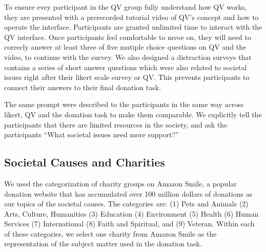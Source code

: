 
To ensure evey participant
in the QV group
fully understand how QV works,
they are presented 
with a prerecorded tutorial video
of QV's concept and how to operate the interface.
Participants are granted unlimited time
to interact with the QV interface.
Once participants feel comfortable to mvoe on, 
they will need to correcly answer at least three
of five mutiple choice questions 
on QV and the video,
to continue with the survey.
We also designed 
a distraction surveys
that contains a series of short answer questions
which were also related to societal issues
right after their likert scale survey or QV.
This prevents participants to 
connect their answers to their final donation task.\par

The same prompt were described 
to the participants in the same way
across likert, QV and the donation task
to make them comparable.
We explicitly tell the participants that
there are limited resources in the society,
and ask the participants
``What societal issues need more support?''\par

\subsection{Societal Causes and Charities}
We used the categorization of charity groups on Amazon Smile,
a popular donation website 
that has accumulated over 100 million dollars of donations
as our topics of the societal causes.
The categories are: 
(1) Pets and Animals 
(2) Arts, Culture, Humanities  
(3) Education 
(4) Environment 
(5) Health 
(6) Human Services 
(7) International 
(8) Faith and Spiritual, and
(9) Veteran.
Within each of these categories, 
we select one charity from Amazon Smile
as the representation
of the subject matter used in the donation task.


